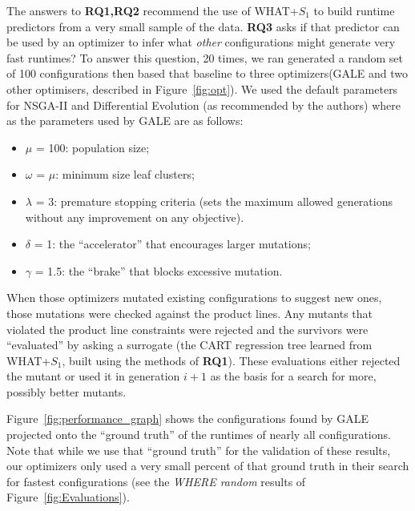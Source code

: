 \documentclass{sig-alternative}
\newcommand{\fig}[1]{Figure~\ref{fig:#1}}
\begin{document}
The answers to {\bf RQ1,RQ2} recommend the use of WHAT+$S_1$ to build runtime predictors from a very small sample
of the data. {\bf RQ3}
asks if that predictor can be used by an optimizer to infer what {\em other} configurations might generate very fast runtimes?
To answer this question, 20 times, we ran generated a random set of 100 
configurations then based that baseline to three optimizers(GALE and two 
other optimisers,  described in \fig{opt}).
We used the default parameters for NSGA-II and Differential Evolution (as recommended by the authors) where as the parameters used by GALE are as follows:
\begin{itemize}
\item $\mu$ = 100: population size;
\item $\omega$ = $\mu$: minimum size leaf clusters;
\item $\lambda$ = 3: premature stopping criteria (sets the maximum
allowed generations without any improvement
on any objective).
\item $\delta$ = 1: the ``accelerator'' that encourages larger
mutations;
\item $\gamma$ = 1.5: the ``brake'' that blocks excessive mutation.
\end{itemize}

When those optimizers mutated existing configurations to suggest new ones,
those mutations were checked against the product lines. Any mutants that violated the product line constraints were rejected
and the survivors were ``evaluated'' by asking a surrogate
(the  CART regression tree learned from WHAT+$S_1$, built using the methods of {\bf RQ1}).
These evaluations either rejected the mutant or used it in generation $i+1$ as the basis for a search for more, possibly
better  mutants.

\fig{performance_graph} shows the configurations found by GALE projected onto the ``ground truth'' of the runtimes of nearly
all configurations. Note that while we use that ``ground truth'' for the validation of these results, our optimizers only
used a very small percent of that ground truth in their search for fastest configurations (see the {\em WHERE random}
results of \fig{Evaluations}).
\end{document}
